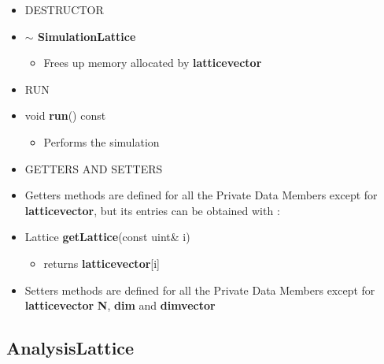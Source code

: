 \begin{itemize}
\begin{itemize}
		\item[] DESTRUCTOR \\
		
			\item[] \textbf{$\sim$ SimulationLattice}	 
			\begin{itemize}
				\item[] Frees up memory allocated by \textbf{lattice\textunderscore vector} 
			\end{itemize}
			
		\item[] RUN \\
			
			\item[] void \textbf{run}() const		 
			\begin{itemize}
				\item[] Performs the simulation 
			\end{itemize}
					
		
		\item[] GETTERS AND SETTERS \\
 			
 			\item[] Getters methods are defined for all the Private Data Members except for \textbf{lattice\textunderscore vector}, but its entries can be obtained with : 
 			  
 			\item[] Lattice \textbf{getLattice}(const uint\& i)		 
			\begin{itemize}
				\item[] returns \textbf{lattice\textunderscore vector}[i]  
			\end{itemize}
 					
 			\item[] Setters methods are defined for all the Private Data Members except for \textbf{lattice\textunderscore vector} \textbf{N}, \textbf{dim} and \textbf{dim\textunderscore vector}   
 			 		
	\end{itemize}

	
\end{itemize}


\subsection*{AnalysisLattice}

